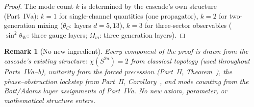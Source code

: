 \documentclass[12pt,a4paper]{article}
\newtheorem*{remark}{Remark}
\begin{document}
\begin{proof}
The mode count $k$ is determined by the cascade's own structure (Part~IVa): $k=1$ for single-channel quantities (one propagator), $k=2$ for two-generation mixing ($\theta_C$: layers $d=5,13$), $k=3$ for three-sector observables ($\sin^2\theta_W$: three gauge layers; $\Omega_m$: three generation layers).
\end{proof}

\begin{remark}[No new ingredient]
Every component of the proof is drawn from the cascade's existing structure: $\chi(S^{2n})=2$ from classical topology (used throughout Parts~IVa--b), unitarity from the forced precession (Part~II, Theorem~), the phase--obstruction lockstep from Part~II, Corollary~, and mode counting from the Bott/Adams layer assignments of Part~IVa. No new axiom, parameter, or mathematical structure enters.
\end{remark}
\end{document}
